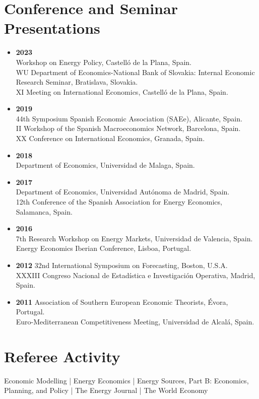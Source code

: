 \documentclass[11pt]{article}\usepackage[]{graphicx}\usepackage[usenames,dvipsnames]{xcolor}
\begin{document}
\section{Conference and Seminar Presentations} 
\begin{itemize}
  \item \textbf{2023}\\
  Workshop on Energy Policy, Castelló de la Plana, Spain.\\
  WU Department of Economics-National Bank of Slovakia: Internal Economic Research Seminar, Bratislava, Slovakia.\\
  XI Meeting on International Economics, Castelló de la Plana, Spain.
  \item \textbf{2019}\\
  44th Symposium Spanish Economic Association (SAEe), Alicante, Spain.\\
  II Workshop of the Spanish Macroeconomics Network, Barcelona, Spain.\\
  XX Conference on International Economics, Granada, Spain.
  \item \textbf{2018}\\
  Department of Economics, Universidad de Malaga, Spain.
  \item \textbf{2017}\\
  Department of Economics, Universidad Autónoma de Madrid, Spain.\\
  12th Conference of the Spanish Association for Energy Economics, Salamanca, Spain.
  \item \textbf{2016}\\
  7th Research Workshop on Energy Markets, Universidad de Valencia, Spain.\\
  Energy Economics Iberian Conference, Lisboa, Portugal.
  \item \textbf{2012} 32nd International Symposium on Forecasting, Boston, U.S.A.\\
  XXXIII Congreso Nacional de Estadística e Investigación Operativa, Madrid, Spain.
  \item \textbf{2011} Association of Southern European Economic Theorists, Évora, Portugal.\\
  Euro-Mediterranean Competitiveness Meeting, Universidad de Alcalá, Spain.
\end{itemize}

\section{Referee Activity}
\raggedright
Economic Modelling | Energy Economics | Energy Sources, Part B: Economics, Planning, and Policy | The Energy Journal | The World Economy\\
\end{document}
